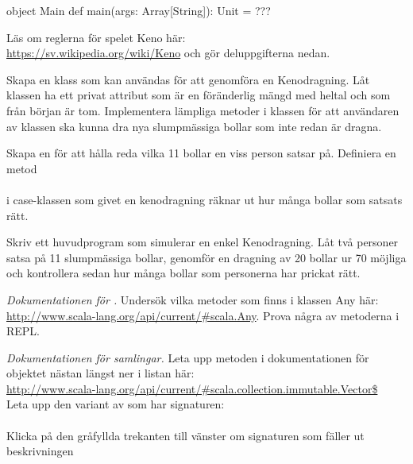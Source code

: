 {{\begin{Code}
object Main {
  def main(args: Array[String]): Unit = {
    ???
  }
}
\end{Code}



\Task \label{task:keno-set} Läs om reglerna för spelet Keno här: \\ \url{https://sv.wikipedia.org/wiki/Keno} och gör deluppgifterna nedan. 

\Subtask Skapa en klass  som kan användas för att genomföra en Kenodragning. Låt klassen ha ett privat attribut  som är en föränderlig mängd med heltal och som från början är tom. Implementera lämpliga metoder i klassen för att användaren av klassen ska kunna dra nya slumpmässiga bollar som inte redan är dragna.  

\Subtask Skapa en  för att hålla reda vilka 11 bollar en viss person satsar på. Definiera en metod \\ \\ i case-klassen  som givet en kenodragning räknar ut hur många bollar som satsats rätt. 

\Subtask Skriv ett huvudprogram som simulerar en enkel Kenodragning. Låt två personer satsa på 11 slumpmässiga bollar, genomför en dragning av 20 bollar ur 70 möjliga och kontrollera sedan hur många bollar som personerna har prickat rätt.




\AdvancedTasks %

\Task \emph{Dokumentationen för .} Undersök vilka metoder som finns i klassen Any här: \href{http://www.scala-lang.org/api/current/\#scala.Any}{http://www.scala-lang.org/api/current/\#scala.Any}. Prova några av metoderna i REPL.

\Task \emph{Dokumentationen för samlingar.} Leta upp metoden  i dokumentationen för objektet  nästan längst ner i listan här: \\ \href{http://www.scala-lang.org/api/current/#scala.collection.immutable.Vector$}{http://www.scala-lang.org/api/current/\#scala.collection.immutable.Vector\$} \\Leta upp den variant av  som har signaturen:\\ \\ Klicka på den gråfyllda trekanten till vänster om signaturen som fäller ut beskrivningen

}}
